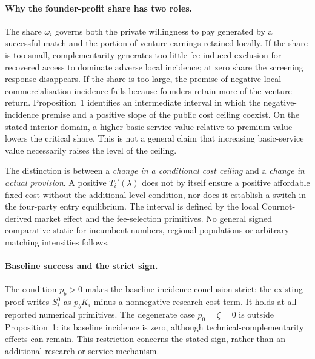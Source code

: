 \paragraph{Why the founder-profit share has two roles.}
The share $\omega_i$ governs both the private willingness to pay generated by a successful match and the portion of venture earnings retained locally. If the share is too small, complementarity generates too little fee-induced exclusion for recovered access to dominate adverse local incidence; at zero share the screening response disappears. If the share is too large, the premise of negative local commercialisation incidence fails because founders retain more of the venture return. Proposition~1 identifies an intermediate interval in which the negative-incidence premise and a positive slope of the public cost ceiling coexist. On the stated interior domain, a higher basic-service value relative to premium value lowers the critical share. This is not a general claim that increasing basic-service value necessarily raises the level of the ceiling.

The distinction is between a \emph{change in a conditional cost ceiling} and a \emph{change in actual provision}. A positive $T_i'(\lambda)$ does not by itself ensure a positive affordable fixed cost without the additional level condition, nor does it establish a switch in the four-party entry equilibrium. The interval is defined by the local Cournot-derived market effect and the fee-selection primitives. No general signed comparative static for incumbent numbers, regional populations or arbitrary matching intensities follows.

\paragraph{Baseline success and the strict sign.}
The condition $p_b>0$ makes the baseline-incidence conclusion strict: the existing proof writes $S_i^0$ as $p_bK_i$ minus a nonnegative research-cost term. It holds at all reported numerical primitives. The degenerate case $p_0=\zeta=0$ is outside Proposition~1: its baseline incidence is zero, although technical-complementarity effects can remain. This restriction concerns the stated sign, rather than an additional research or service mechanism.


